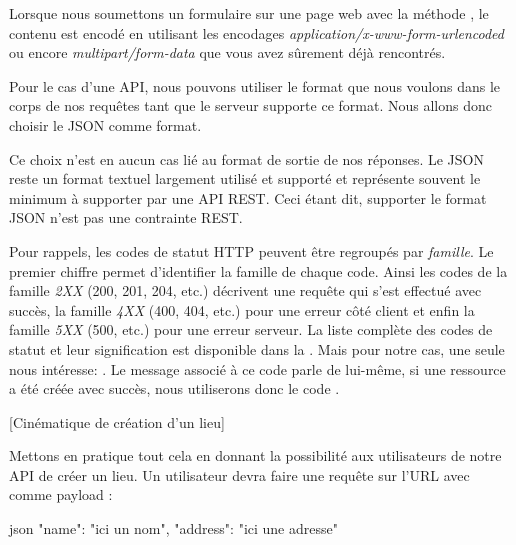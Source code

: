 \documentclass[big]{zmdocument}
\begin{document}
Lorsque nous soumettons un formulaire sur une page web avec la méthode , le contenu est encodé en utilisant les encodages \textit{application/x-www-form-urlencoded} ou encore \textit{multipart/form-data} que vous avez sûrement déjà rencontrés.



Pour le cas d'une API, nous pouvons utiliser le format que nous voulons dans le corps de nos requêtes tant que le serveur supporte ce format. Nous allons donc choisir le JSON comme format.



\begin{Information}
Ce choix n'est en aucun cas lié au format de sortie de nos réponses. Le JSON reste un format textuel largement utilisé et supporté et représente souvent le minimum à supporter par une API REST. Ceci étant dit, supporter le format JSON n'est pas une contrainte REST.
\end{Information}




Pour rappels, les codes de statut HTTP peuvent être regroupés par \textit{famille}. Le premier chiffre permet d'identifier la famille de chaque code. Ainsi les codes de la famille \textit{2XX} (200, 201, 204, etc.) décrivent une requête qui s'est effectué avec succès, la famille \textit{4XX} (400, 404, etc.) pour une erreur côté client et enfin la famille \textit{5XX} (500, etc.) pour une erreur serveur.
La liste complète des codes de statut et leur signification est disponible dans la .
Mais pour notre cas, une seule nous intéresse: . Le message associé à ce code parle de lui-même, si une ressource a été créée avec succès, nous utiliserons donc le code .



[Cinématique de création d'un lieu]




Mettons en pratique tout cela en donnant la possibilité aux utilisateurs de notre API de créer un lieu.
Un utilisateur devra faire une requête  sur l'URL  avec comme payload :



\begin{CodeBlock}{json}
{
    "name": "ici un nom",
    "address": "ici une adresse"
}
\end{CodeBlock}
\end{document}
